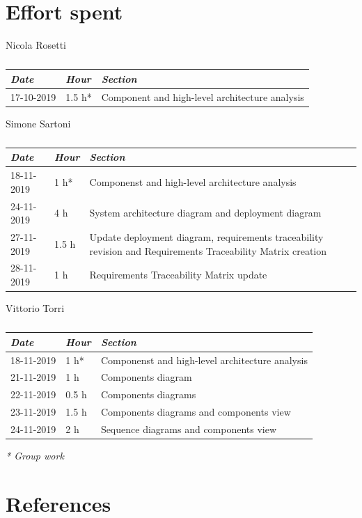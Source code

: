 \documentclass[a4paper]{report}
\begin{document}
\chapter{Effort spent}

\begin{table}[H]
\centering
Nicola Rosetti \\
\begin{tabular}{p{2cm}p{1.5cm}p{7cm}}
\toprule
\textit{Date} & \textit{Hour} & \textit{Section} \\ \midrule
17-10-2019 & 1.5 h* & Component and high-level architecture analysis \\ \midrule
\bottomrule
\end{tabular}
\caption[Nicola Rosetti's effort table]{}
\end{table}


\vspace*{1 cm}
\begin{table}[H]
\centering
Simone Sartoni \\
\begin{tabular}{p{2cm}p{1.5cm}p{7cm}}
\toprule
\textit{Date} & \textit{Hour} & \textit{Section} \\ \midrule
18-11-2019 & 1 h* & Componenst and high-level architecture analysis \\ \midrule
24-11-2019 & 4 h &  System architecture diagram and deployment diagram\\ \midrule
27-11-2019 & 1.5 h & Update deployment diagram, requirements traceability revision and Requirements Traceability Matrix creation \\ \midrule
28-11-2019 & 1 h & Requirements Traceability Matrix update \\ \midrule

\bottomrule
\end{tabular}
\caption[Simone Sartoni's effort table]{}
\end{table}
\vspace*{1 cm}
\begin{table}[H]
\centering
Vittorio Torri \\
\begin{tabular}{p{2cm}p{1.5cm}p{7cm}}
\toprule
\textit{Date} & \textit{Hour} & \textit{Section} \\ \midrule
18-11-2019 & 1 h* & Componenst and high-level architecture analysis \\ \midrule
21-11-2019 & 1 h  & Components diagram \\ \midrule
22-11-2019 & 0.5 h & Components diagrams \\ \midrule
23-11-2019 & 1.5 h & Components diagrams and components view\\ \midrule
24-11-2019 & 2 h & Sequence diagrams and components view \\ \midrule
\bottomrule
\end{tabular}
\caption[Vittorio Torri's effort table]{}
\end{table}
\textit{* Group work}

\chapter{References}
\end{document}
